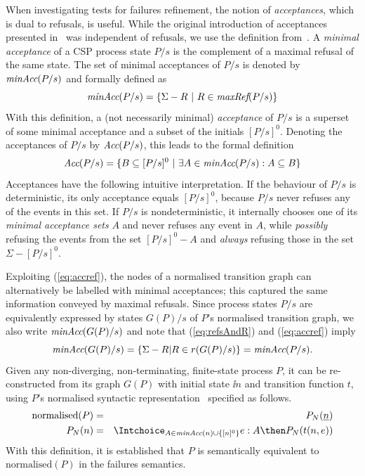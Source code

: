 When investigating tests for failures refinement, the notion of
\emph{acceptances}, which is dual to refusals, is useful. While the
original introduction of acceptances presented
in~\cite[pp.~75]{Hennessy:1988:ATP:50497} was independent of refusals, we use
the definition from~\cite[pp.~278]{Roscoe:1997:TPC:550448}.   A \emph{minimal
acceptance} of a CSP process state $P/s$ is the complement of a maximal
refusal of the same state. The set of minimal acceptances of $P/s$ is denoted
by $\text{\it minAcc}(P/s)$ and formally defined as
%
\begin{equation}\label{eq:accref}
\text{\it minAcc}(P/s) = \{ \Sigma - R~|~R\in \text{\it maxRef}(P/s)  \}
\end{equation}
%
With this definition, a (not necessarily minimal) \emph{acceptance} of $P/s$ is a superset of some minimal acceptance and a subset of the initials $[P/s]^0$. Denoting the acceptances of $P/s$ by $\text{\it Acc}(P/s)$, this leads to the formal definition
\begin{equation}
\label{eq:accrefall}
\text{\it Acc}(P/s)  = \{ B\subseteq [P/s]^0~|~\exists A\in\text{\it minAcc}(P/s):  A \subseteq B   \}
\end{equation}
%
Acceptances have the following intuitive interpretation.  If the behaviour of
$P/s$ is deterministic, its only acceptance equals $[P/s]^0$, because $P/s$
never refuses any of the events in this set. If $P/s$ is nondeterministic, it
internally chooses one of its \emph{minimal acceptance sets} $A$ and never
refuses any event in $A$, while {\it possibly} refusing the events from the
set $[P/s]^0 - A$ and {\it always} refusing those in the set $\Sigma -
[P/s]^0$.

Exploiting (\ref{eq:accref}), the nodes of a normalised transition graph can
alternatively be labelled with minimal acceptances; this captured the same
information conveyed by maximal refusals. Since process states $P/s$ are
equivalently expressed by states $G(P)/s$ of $P$'s normalised transition
graph, we also write $\text{\it minAcc}(G(P)/s)$ and note that (\ref{eq:refsAndR}) and
(\ref{eq:accref}) imply
\begin{equation}\label{eq:maxrefsminaccs}
\text{\it minAcc}(G(P)/s) = \{ \Sigma - R | R\in r(G(P)/s) \} = \text{\it minAcc}(P/s).
\end{equation}
%
Given any non-diverging, non-terminating, finite-state process $P$, it can be
re-con\-struc\-ted from its graph $G(P)$ with initial state $\ii
n$ and transition function $t$, using $P$'s normalised syntactic
representation~\cite[pp.~277]{Roscoe:1997:TPC:550448} specified as follows.
\begin{eqnarray*}
\text{normalised}(P) & = & P_N(\ii n)
\\
P_N(n) & = & \Intchoice_{A\in\minaccs(n)\cup \{ [n]^0 \} } e:A\then P_N(t(n,e))
\end{eqnarray*}
With this definition, it is established that $P$ is semantically equivalent
to $\text{normalised}(P)$ in the failures semantics.

